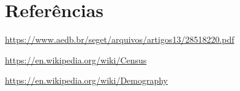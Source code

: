 \documentclass[a4paper,12pt]{article}
\begin{document}
\newpage
\section*{Referências}
\markright{}
\par\url{https://www.aedb.br/seget/arquivos/artigos13/28518220.pdf}
\par\url{https://en.wikipedia.org/wiki/Census}
\par\url{https://en.wikipedia.org/wiki/Demography}
\end{document}
